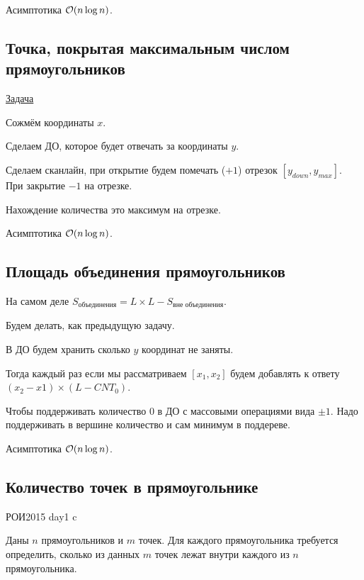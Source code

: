 Асимптотика $\mathcal{O}(n \log n)$.


\pagebreak

\subsection{Точка, покрытая максимальным числом прямоугольников}

\href{https://informatics.mccme.ru/mod/statements/view3.php?chapterid=111800}{Задача} \href{https://pastebin.com/0psZgeC1}{}

Сожмём координаты $x$.

Сделаем ДО, которое будет отвечать за координаты $y$.

Сделаем сканлайн, при открытие будем помечать ($+1$) отрезок $[y_{down}, y_{max}]$. При закрытие $-1$ на отрезке.

Нахождение количества это максимум на отрезке. 

Асимптотика $\mathcal{O}(n \log n)$.

\subsection{Площадь объединения прямоугольников}

\href{http://informatics.mccme.ru/mod/statements/view3.php?id=20962&chapterid=3858#1}{} \href{https://pastebin.com/MqQAEafF}{}

На самом деле $S_{\text{объединения}}=L \times L - S_{\text{вне объединения}}$. 

Будем делать, как предыдущую задачу.

В ДО будем хранить сколько $y$ координат не заняты.

Тогда каждый раз если мы рассматриваем $[x_1, x_2]$ будем добавлять к ответу $(x_2 - x1) \times (L - CNT_0)$.

Чтобы поддерживать количество $0$ в ДО с массовыми операциями вида $\pm 1$. Надо поддерживать в вершине количество и сам минимум в поддереве. 

Асимптотика $\mathcal{O}(n \log n)$.

\subsection{Количество точек в прямоугольнике}

РОИ2015 day1 c

Даны $n$ прямоугольников и $m$ точек. Для каждого прямоугольника требуется определить, сколько из данных $m$ точек лежат внутри каждого из $n$ прямоугольника.


